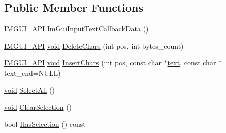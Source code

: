 \subsection*{Public Member Functions}
\begin{DoxyCompactItemize}
\item 
\hyperlink{imgui_8h_a43829975e84e45d1149597467a14bbf5}{I\+M\+G\+U\+I\+\_\+\+A\+PI} \hyperlink{structImGuiInputTextCallbackData_ae19641bad15c1a163928d121075ca09c}{Im\+Gui\+Input\+Text\+Callback\+Data} ()
\item 
\hyperlink{imgui_8h_a43829975e84e45d1149597467a14bbf5}{I\+M\+G\+U\+I\+\_\+\+A\+PI} \hyperlink{imgui__impl__opengl3__loader_8h_ac668e7cffd9e2e9cfee428b9b2f34fa7}{void} \hyperlink{structImGuiInputTextCallbackData_ab5dc30d7edcf60efbd5bb8e677dab8bf}{Delete\+Chars} (int pos, int bytes\+\_\+count)
\item 
\hyperlink{imgui_8h_a43829975e84e45d1149597467a14bbf5}{I\+M\+G\+U\+I\+\_\+\+A\+PI} \hyperlink{imgui__impl__opengl3__loader_8h_ac668e7cffd9e2e9cfee428b9b2f34fa7}{void} \hyperlink{structImGuiInputTextCallbackData_a9963937f48aba00466c2af404dad1e25}{Insert\+Chars} (int pos, const char $\ast$\hyperlink{game__play__state_8cpp_a295b62c787445f811e691da4b10f6be4}{text}, const char $\ast$text\+\_\+end=N\+U\+LL)
\item 
\hyperlink{imgui__impl__opengl3__loader_8h_ac668e7cffd9e2e9cfee428b9b2f34fa7}{void} \hyperlink{structImGuiInputTextCallbackData_aabbc96c73ebcec89f06811dba531bc56}{Select\+All} ()
\item 
\hyperlink{imgui__impl__opengl3__loader_8h_ac668e7cffd9e2e9cfee428b9b2f34fa7}{void} \hyperlink{structImGuiInputTextCallbackData_a14dacdd841c76dfd171ffca8a96d7c22}{Clear\+Selection} ()
\item 
bool \hyperlink{structImGuiInputTextCallbackData_aae1b69a904053961be171d7f47ef430e}{Has\+Selection} () const
\end{DoxyCompactItemize}

